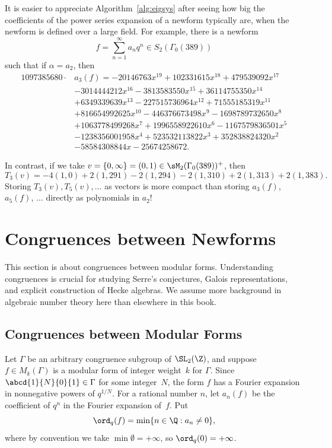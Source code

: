 \begin{example}
  It is easier to appreciate Algorithm~\ref{alg:eigsys} after seeing
  how big the coefficients of the power series expansion of a newform
  typically are, when the newform is defined over a large field. For
  example, there is a newform
$$
  f = \sum_{n=1}^{\infty} a_n q^n\in S_2(\Gamma_0(389))
$$ 
such that if $\alpha = a_2$, then
\begin{align*}
1097385680 \cdot &a_3(f) = 
-20146763x^{19} + 102331615x^{18} + 479539092x^{17} \\
 &- 3014444212x^{16} - 3813583550x^{15} + 36114755350x^{14} \\
 &+ 6349339639x^{13} - 227515736964x^{12} + 71555185319x^{11} \\
 &+ 816654992625x^{10} - 446376673498x^{9} - 1698789732650x^{8} \\
 &+ 1063778499268x^{7} + 1996558922610x^{6} - 1167579836501x^{5}\\
 & - 1238356001958x^{4} + 523532113822x^{3} + 352838824320x^{2} \\
 &- 58584308844x - 25674258672.
\end{align*}

In contrast, if we take $v=\{0,\infty\} = (0,1) \in
\sM_2(\Gamma_0(389))^+$, then 
$$
  T_3(v) = -4(1,0) + 2(1,291) - 2(1,294) - 2(1,310) + 2(1,313) + 2(1,383).
$$
Storing $T_3(v), T_5(v), \ldots$ as vectors 
is more compact than storing
$a_3(f)$, $a_5(f)$, $\ldots$ directly as polynomials in $a_2$!
\end{example}


\section{Congruences between Newforms}
This section is about congruences between modular forms.
Understanding congruences is crucial for studying Serre's
conjectures, Galois representations, and explicit construction of
Hecke algebras.  We assume more background in algebraic number theory
here than elsewhere in this book.

\subsection{Congruences between Modular Forms}
Let $\Gamma$ be an arbitrary congruence subgroup of $\SL_2(\Z)$,
and suppose $f\in M_k(\Gamma)$ is a modular form of integer weight~$k$
for $\Gamma$. Since $\abcd{1}{N}{0}{1}\in\Gamma$ for some integer~$N$,
the form $f$ has a Fourier expansion in
nonnegative powers of $q^{1/N}$.  For a rational
number $n$, let $a_n(f)$ be the coefficient of $q^n$ in
the Fourier expansion of~$f$.
Put
$$
  \ord_q(f) = \min\{n\in \Q : a_n \neq 0\},
$$
where by convention we take $\min \emptyset = +\infty$,
so $\ord_q(0)=+\infty$.

